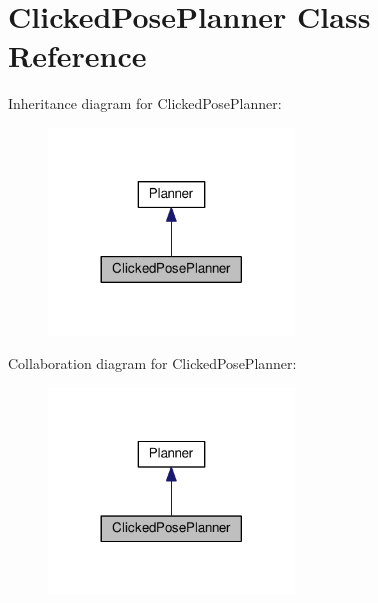 \hypertarget{classClickedPosePlanner}{}\section{Clicked\+Pose\+Planner Class Reference}
\label{classClickedPosePlanner}


Inheritance diagram for Clicked\+Pose\+Planner\+:\nopagebreak
\begin{figure}[H]
\begin{center}
\leavevmode
\includegraphics[width=185pt]{classClickedPosePlanner__inherit__graph}
\end{center}
\end{figure}


Collaboration diagram for Clicked\+Pose\+Planner\+:\nopagebreak
\begin{figure}[H]
\begin{center}
\leavevmode
\includegraphics[width=185pt]{classClickedPosePlanner__coll__graph}
\end{center}
\end{figure}
